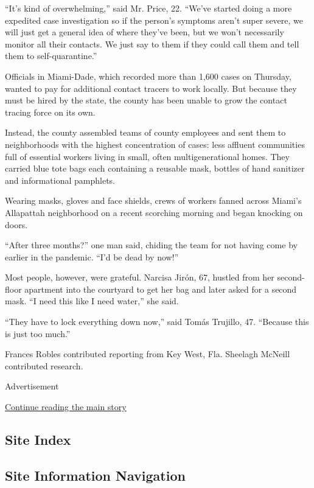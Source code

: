 ``It's kind of overwhelming,'' said Mr. Price, 22. ``We've started doing
a more expedited case investigation so if the person's symptoms aren't
super severe, we will just get a general idea of where they've been, but
we won't necessarily monitor all their contacts. We just say to them if
they could call them and tell them to self-quarantine.''

Officials in Miami-Dade, which recorded more than 1,600 cases on
Thursday, wanted to pay for additional contact tracers to work locally.
But because they must be hired by the state, the county has been unable
to grow the contact tracing force on its own.

Instead, the county assembled teams of county employees and sent them to
neighborhoods with the highest concentration of cases: less affluent
communities full of essential workers living in small, often
multigenerational homes. They carried blue tote bags each containing a
reusable mask, bottles of hand sanitizer and informational pamphlets.

Wearing masks, gloves and face shields, crews of workers fanned across
Miami's Allapattah neighborhood on a recent scorching morning and began
knocking on doors.

``After three months?'' one man said, chiding the team for not having
come by earlier in the pandemic. ``I'd be dead by now!''

Most people, however, were grateful. Narcisa Jirón, 67, hustled from her
second-floor apartment into the courtyard to get her bag and later asked
for a second mask. ``I need this like I need water,'' she said.

``They have to lock everything down now,'' said Tomás Trujillo, 47.
``Because this is just too much.''

Frances Robles contributed reporting from Key West, Fla. Sheelagh
McNeill contributed research.

Advertisement

\protect\hyperlink{after-bottom}{Continue reading the main story}

\hypertarget{site-index}{%
\subsection{Site Index}\label{site-index}}

\hypertarget{site-information-navigation}{%
\subsection{Site Information
Navigation}\label{site-information-navigation}}

